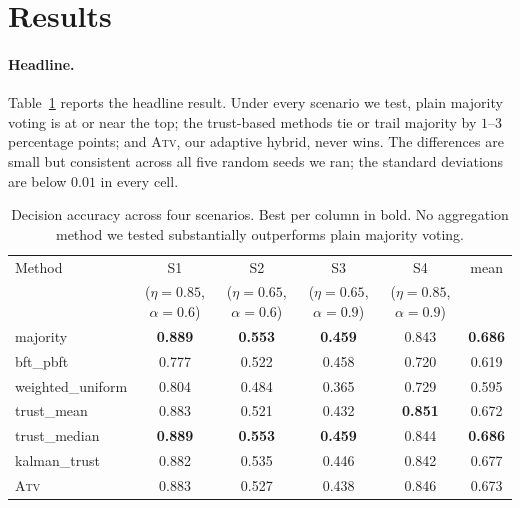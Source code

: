 \documentclass[11pt]{article}
\begin{document}
\section{Results}
\label{sec:results}

\paragraph{Headline.}
Table~\ref{tab:main} reports the headline result. Under every scenario
we test, plain majority voting is at or near the top; the trust-based
methods tie or trail majority by $1$--$3$ percentage points; and
\textsc{Atv}, our adaptive hybrid, never wins. The differences are
small but consistent across all five random seeds we ran; the
standard deviations are below $0.01$ in every cell.

\begin{table}[ht]
\caption{Decision accuracy across four scenarios. Best per column
in bold. No aggregation method we tested substantially outperforms
plain majority voting.}
\label{tab:main}
\centering
\small
\begin{tabular}{lccccc}
\toprule
Method & S1 & S2 & S3 & S4 & mean \\
 & ($\eta{=}0.85$, $\alpha{=}0.6$)
 & ($\eta{=}0.65$, $\alpha{=}0.6$)
 & ($\eta{=}0.65$, $\alpha{=}0.9$)
 & ($\eta{=}0.85$, $\alpha{=}0.9$)
 & \\
\midrule
majority            & \textbf{0.889} & \textbf{0.553} & \textbf{0.459} & 0.843 & \textbf{0.686} \\
bft\_pbft           & 0.777 & 0.522 & 0.458 & 0.720 & 0.619 \\
weighted\_uniform   & 0.804 & 0.484 & 0.365 & 0.729 & 0.595 \\
trust\_mean         & 0.883 & 0.521 & 0.432 & \textbf{0.851} & 0.672 \\
trust\_median       & \textbf{0.889} & \textbf{0.553} & \textbf{0.459} & 0.844 & \textbf{0.686} \\
kalman\_trust       & 0.882 & 0.535 & 0.446 & 0.842 & 0.677 \\
\textsc{Atv}        & 0.883 & 0.527 & 0.438 & 0.846 & 0.673 \\
\bottomrule
\end{tabular}
\end{table}
\end{document}
